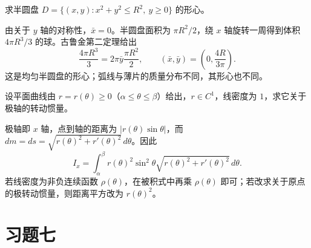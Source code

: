 \begin{example}
\label{ex:semidisk-centroid}
求半圆盘 $D=\{(x,y):x^2+y^2\leq R^2,\ y\geq0\}$ 的形心。
\end{example}
\begin{solve}
由关于 $y$ 轴的对称性，$\bar x=0$。半圆盘面积为 $\pi R^2/2$，绕 $x$ 轴旋转一周得到体积 $4\pi R^3/3$ 的球。古鲁金第二定理给出
\[
    \frac{4\pi R^3}{3}
    =2\pi\bar y\frac{\pi R^2}{2},
    \qquad
    (\bar x,\bar y)=\left(0,\frac{4R}{3\pi}\right).
\]
这是均匀半圆盘的形心；弧线与薄片的质量分布不同，其形心也不同。
\end{solve}

\begin{example}
\label{ex:polar-wire-moment-of-inertia}
设平面曲线由 $r=r(\theta)\geq0$（$\alpha\leq\theta\leq\beta$）给出，$r\in C^1$，线密度为 $1$，求它关于极轴的转动惯量。
\end{example}
\begin{solve}
极轴即 $x$ 轴，点到轴的距离为 $|r(\theta)\sin\theta|$，而 $dm=ds=\sqrt{r(\theta)^2+r'(\theta)^2}\,d\theta$。因此
\[
    I_x=\int_\alpha^\beta
    r(\theta)^2\sin^2\theta
    \sqrt{r(\theta)^2+r'(\theta)^2}\,d\theta.
\]
若线密度为非负连续函数 $\rho(\theta)$，在被积式中再乘 $\rho(\theta)$ 即可；若改求关于原点的极转动惯量，则距离平方改为 $r(\theta)^2$。
\end{solve}

\section*{习题七}

